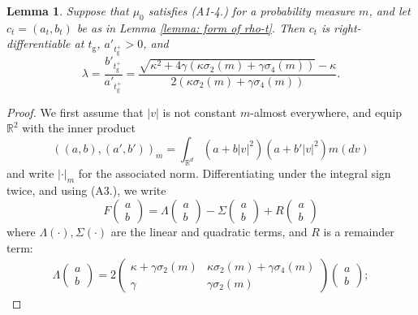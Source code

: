\documentclass[11pt, notitlepage]{article}
\newtheorem{lem}[thm]{Lemma}
\begin{document}
\begin{lem}\label{lemma: BNCP} Suppose that $\mu_0$ satisfies (A1-4.) for a probability measure $m$, and let $c_t=(a_t, b_t)$ be as in Lemma \ref{lemma: form of rho-t}.  Then $c_t$ is right-differentiable at $t_\mathrm{g}$, $a'_{t_\mathrm{g}^+}>0$, and \begin{equation}\label{eq: ratio of r derivatives} \lambda = \frac{b'_{t_\mathrm{g}^+}}{a'_{t_\mathrm{g}^+}}=\frac{\sqrt{\kappa^2+4\gamma(\kappa\sigma_2(m)+\gamma \sigma_4(m))}-\kappa}{2(\kappa\sigma_2(m)+\gamma\sigma_4(m))}. \end{equation}  \end{lem} \begin{proof} We first assume that $|v|$ is not constant $m$-almost everywhere, and equip $\mathbb{R}^2$ with the inner product \begin{equation} \left((a,b),(a',b')\right)_m=\int_{\mathbb{R}^d} (a+b|v|^2)(a+b'|v|^2)m(dv)  \end{equation} and write $|\cdot|_m$ for the associated norm.  Differentiating under the integral sign twice, and using (A3.), we write \begin{equation} F\left(\begin{matrix} a \\ b \end{matrix}\right) = \Lambda\left(\begin{matrix} a \\ b \end{matrix}\right)-\Sigma \left(\begin{matrix} a \\ b \end{matrix}\right) + R\left(\begin{matrix} a \\ b \end{matrix}\right) \end{equation} where $\Lambda(\cdot), \Sigma(\cdot)$ are the linear and quadratic terms, and $R$ is a remainder term:   \begin{gather} \label{eq: defn of L}
    \Lambda\left(\begin{matrix} a \\ b \end{matrix}\right)=2\left(\begin{matrix} \kappa+\gamma\sigma_2(m) & \kappa \sigma_2(m)+\gamma\sigma_4(m)\\ \gamma & \gamma \sigma_2(m) \end{matrix}\right)\left(\begin{matrix} a \\ b \end{matrix}\right);

\end{gather}
\end{proof}
\end{document}
